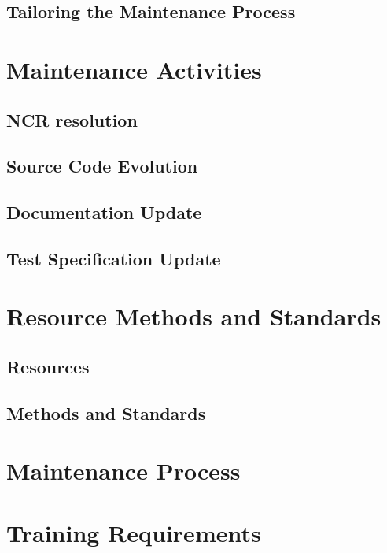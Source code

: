 \subsection{Tailoring the Maintenance Process}

\section{Maintenance Activities}

\subsection{NCR resolution}
\subsection{Source Code Evolution}
\subsection{Documentation Update}
\subsection{Test Specification Update}

\section{Resource Methods and Standards}

\subsection{Resources}
\subsection{Methods and Standards}


\section{Maintenance Process}

\section{Training Requirements}
